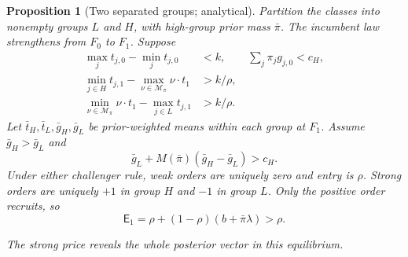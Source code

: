 \documentclass[12pt]{article}
\newtheorem{proposition}{Proposition}
\begin{document}
\begin{proposition}[Two separated groups; analytical]\label{prop:groups}
Partition the classes into nonempty groups $L$ and $H$, with high-group prior mass $\bar\pi$.
The incumbent law strengthens from $F_0$ to $F_1$.
Suppose
\begin{align}\label{eq:groups}
 \max_jt_{j,0}-\min_jt_{j,0}&<k,\qquad \sum_j\pi_jg_{j,0}<c_H,\\
 \min_{j\in H}t_{j,1}-\max_{\nu\in\mathcal M_\pi}\nu\cdot t_1&>k/\rho,\nonumber\\
 \min_{\nu\in\mathcal M_\pi}\nu\cdot t_1-\max_{j\in L}t_{j,1}&>k/\rho.\nonumber
\end{align}
Let $\bar t_H,\bar t_L,\bar g_H,\bar g_L$ be prior-weighted means within each group at $F_1$.
Assume $\bar g_H>\bar g_L$ and
\[
 \bar g_L+M(\bar\pi)(\bar g_H-\bar g_L)>c_H.
\]
Under either challenger rule, weak orders are uniquely zero and entry is $\rho$.
Strong orders are uniquely $+1$ in group $H$ and $-1$ in group $L$.
Only the positive order recruits, so
\[
 \mathsf E_1=\rho+(1-\rho)(b+\bar\pi\lambda)>\rho.
\]

The strong price reveals the whole posterior vector in this equilibrium.
\end{proposition}
\end{document}
